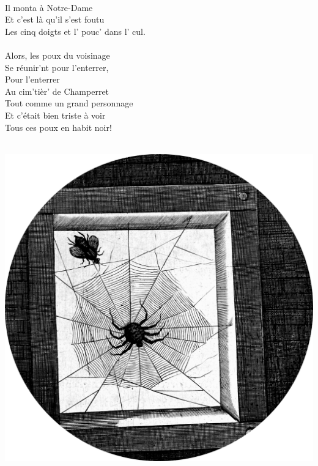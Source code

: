 \\Il monta à Notre-Dame
\\Et c'est là qu'il s'est foutu
\\Les cinq doigts et l' pouc' dans l' cul.
\breakpage
\\\\Alors, les poux du voisinage
\\Se réunir'nt pour l'enterrer,
\\Pour l'enterrer
\\Au cim'tièr' de Champerret
\\Tout comme un grand personnage
\\Et c'était bien triste à voir
\\Tous ces poux en habit noir!
\\\\
\bigskip
\begin{center}
   \includegraphics[width=1\textwidth]{images/brev32.png}
 \end{center}


\breakpage